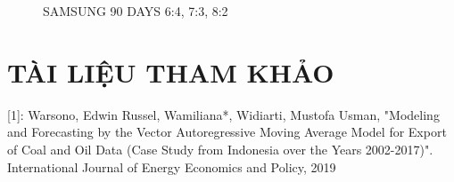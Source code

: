 \documentclass{article}
\begin{document}
\begin{multicols}{2}
\begin{figure}[H]
\begin{minipage}{0.15\textwidth}
    \label{fig:3}
    \end{minipage}
    \caption{SAMSUNG 90 DAYS  6:4, 7:3, 8:2 }
\end{figure}

\section{TÀI LIỆU THAM KHẢO}

 
[1]: Warsono, Edwin Russel, Wamiliana*, Widiarti, Mustofa Usman, "Modeling and Forecasting by the Vector Autoregressive Moving Average Model for Export of Coal and Oil Data (Case Study from Indonesia over the Years 2002-2017)". International Journal of Energy Economics and Policy, 2019



\end{multicols}
\end{document}
